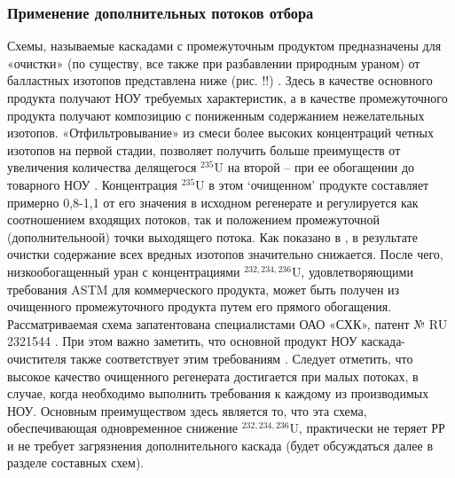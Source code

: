\subsubsection{Применение дополнительных потоков отбора}
Схемы, называемые каскадами с промежуточным продуктом предназначены для «очистки» (по существу, все также при разбавлении природным ураном) от балластных изотопов представлена ниже (рис. !!) \cite{palkinAnaliticheskiyRaschetSoderzhaniya2007}. Здесь в качестве основного продукта получают НОУ требуемых характеристик, а в качестве промежуточного продукта получают композицию с пониженным содержанием нежелательных изотопов.
«Отфильтровывание» из смеси более высоких концентраций четных изотопов на первой стадии, позволяет получить больше преимуществ от увеличения количества делящегося $^{235}$U на второй -- при ее обогащении до товарного НОУ \cite{palkinSeparationUraniumIsotopes2010}.
Концентрация $^{235}$U в этом `очищенном' продукте составляет примерно 0,8-1,1 от его значения в исходном регенерате и регулируется как соотношением входящих потоков, так и положением промежуточной (дополнительноой) точки выходящего потока.
Как показано в \cite{palkinSeparationUraniumIsotopes2010}, в результате очистки содержание всех вредных изотопов значительно снижается. После чего, низкообогащенный уран с концентрациями $^{232,234,236}$U, удовлетворяющими требования ASTM для коммерческого продукта, может быть получен из очищенного промежуточного продукта путем его прямого обогащения. Рассматриваемая схема запатентована специалистами ОАО «СХК», патент № RU 2321544 \cite{shopenSposobPolucheniyaRazbavitelya2008}.
При этом важно заметить, что основной продукт НОУ каскада-очистителя также соответствует этим требованиям \cite{palkinSeparationUraniumIsotopes2010}. Следует отметить, что высокое качество очищенного регенерата достигается при малых потоках, в случае, когда необходимо выполнить требования к каждому из производимых НОУ.
Основным преимуществом здесь является то, что эта схема, обеспечивающая одновременное снижение $^{232,234,236}$U, практически не теряет РР и не требует загрязнения дополнительного каскада (будет обсуждаться далее в разделе составных схем).

